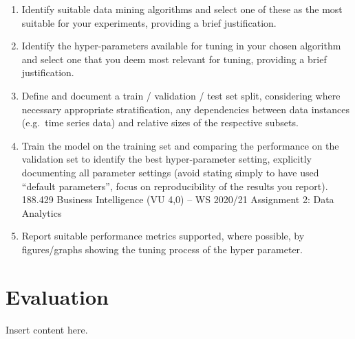 \documentclass[sigchi]{acmart}
\def\tightlist{}
\begin{document}
\begin{enumerate}
\def\labelenumi{\alph{enumi}.}
\tightlist
\item
  Identify suitable data mining algorithms and select one of these as the most suitable for your experiments, providing a brief justification.
\item
  Identify the hyper-parameters available for tuning in your chosen algorithm and select one that you deem most relevant for tuning, providing a brief justification.
\item
  Define and document a train / validation / test set split, considering where necessary appropriate stratification, any dependencies between data instances (e.g.~time series data) and relative sizes of the respective subsets.
\item
  Train the model on the training set and comparing the performance on the validation set to identify the best hyper-parameter setting, explicitly documenting all parameter settings (avoid stating simply to have used ``default parameters'', focus on reproducibility of the results you report).
  188.429 Business Intelligence (VU 4,0) -- WS 2020/21 Assignment 2: Data Analytics
\item
  Report suitable performance metrics supported, where possible, by figures/graphs showing the tuning process of the hyper parameter.
\end{enumerate}

\hypertarget{evaluation}{%
\section{Evaluation}\label{evaluation}}

Insert content here.
\end{document}
